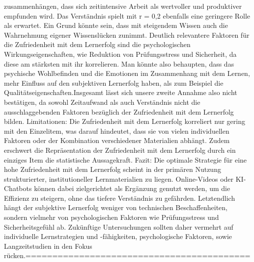 \documentclass[a4paper, 12pt]{article}
\begin{document}
zusammenhängen, dass sich zeitintensive Arbeit als wertvoller und produktiver empfunden wird. Das Verständnis spielt mit r = 0,2 ebenfalls eine geringere Rolle als erwartet. Ein Grund könnte sein, dass mit steigendem Wissen auch die Wahrnehmung eigener Wissenslücken zunimmt. Deutlich relevantere Faktoren für die Zufriedenheit mit dem Lernerfolg sind die psychologischen Wirkungseigenschaften, wie Reduktion von Prüfungsstress und Sicherheit, da diese am stärksten mit ihr korrelieren. Man könnte also behaupten, dass das psychische Wohlbefinden und die Emotionen im Zusammenhang mit dem Lernen, mehr Einfluss auf den subjektiven Lernerfolg haben, als zum Beispiel die Qualitätseigenschaften.Insgesamt lässt sich unsere zweite Annahme also nicht bestätigen, da sowohl Zeitaufwand als auch Verständnis nicht die ausschlaggebenden Faktoren bezüglich der Zufriedenheit mit dem Lernerfolg bilden. Limitationen: Die Zufriedenheit mit dem Lernerfolg korreliert nur gering mit den Einzelitem, was darauf hindeutet, dass sie von vielen individuellen Faktoren oder der Kombination verschiedener Materialien abhängt. Zudem erschwert die Repräsentation der Zufriedenheit mit dem Lernerfolg durch ein einziges Item die statistische Aussagekraft. Fazit: Die optimale Strategie für eine hohe Zufriedenheit mit dem Lernerfolg scheint in der primären Nutzung strukturierter, institutioneller Lernmaterialien zu liegen. Online-Videos oder KI-Chatbots können dabei zielgerichtet als Ergänzung genutzt werden, um die Effizienz zu steigern, ohne das tiefere Verständnis zu gefährden. Letztendlich hängt der subjektive Lernerfolg weniger von technischen Beschaffenheiten, sondern vielmehr von psychologischen Faktoren wie Prüfungsstress und Sicherheitsgefühl ab. Zukünftige Untersuchungen sollten daher vermehrt auf individuelle Lernstrategien und -fähigkeiten, psychologische Faktoren, sowie Langzeitstudien in den Fokus rücken.==========================================
\end{document}
